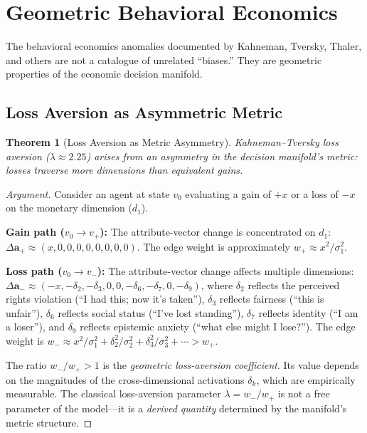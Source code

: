 \documentclass[12pt]{article}
\newtheorem{theorem}{Theorem}[section]
\theoremstyle{definition}
\theoremstyle{remark}
\begin{document}
\section{Geometric Behavioral Economics}
\label{sec:behavioral}

The behavioral economics anomalies documented by Kahneman, Tversky, Thaler, and others are not a catalogue of unrelated ``biases.''  They are geometric properties of the economic decision manifold.

\subsection{Loss Aversion as Asymmetric Metric}

\begin{theorem}[Loss Aversion as Metric Asymmetry]
\label{thm:loss_aversion}
Kahneman--Tversky loss aversion ($\lambda \approx 2.25$) arises from an asymmetry in the decision manifold's metric: losses traverse \emph{more dimensions} than equivalent gains.
\end{theorem}

\begin{proof}[Argument]
Consider an agent at state $v_0$ evaluating a gain of $+x$ or a loss of $-x$ on the monetary dimension ($d_1$).

\textbf{Gain path ($v_0 \to v_+$):} The attribute-vector change is concentrated on $d_1$: $\Delta \mathbf{a}_+ \approx (x, 0, 0, 0, 0, 0, 0, 0, 0)$.  The edge weight is approximately $w_+ \approx x^2 / \sigma_1^2$.

\textbf{Loss path ($v_0 \to v_-$):} The attribute-vector change affects multiple dimensions: $\Delta \mathbf{a}_- \approx (-x, -\delta_2, -\delta_3, 0, 0, -\delta_6, -\delta_7, 0, -\delta_9)$, where $\delta_2$ reflects the perceived rights violation (``I had this; now it's taken''), $\delta_3$ reflects fairness (``this is unfair''), $\delta_6$ reflects social status (``I've lost standing''), $\delta_7$ reflects identity (``I am a loser''), and $\delta_9$ reflects epistemic anxiety (``what else might I lose?'').  The edge weight is $w_- \approx x^2/\sigma_1^2 + \delta_2^2/\sigma_2^2 + \delta_3^2/\sigma_3^2 + \cdots > w_+$.

The ratio $w_- / w_+ > 1$ is the \emph{geometric loss-aversion coefficient}.  Its value depends on the magnitudes of the cross-dimensional activations $\delta_k$, which are empirically measurable.  The classical loss-aversion parameter $\lambda = w_- / w_+$ is not a free parameter of the model---it is a \emph{derived quantity} determined by the manifold's metric structure.
\end{proof}
\end{document}
